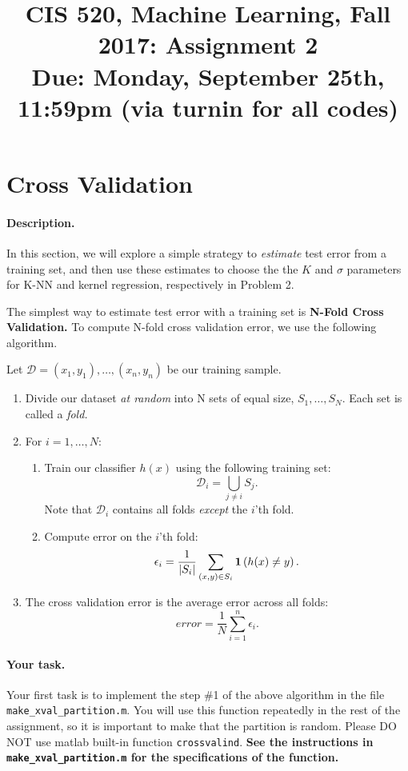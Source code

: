 \documentclass[english]{article}
\title{CIS 520, Machine Learning, Fall 2017: Assignment 2\\
Due: Monday, September 25th, 11:59pm (via turnin for all codes)
\ifthenelse{\boolean{ShowSolutions}}{ \\ \bf Solutions }{} }
\date{}
\begin{document}
\maketitle


\section{Cross Validation }

\paragraph{Description.} In this section, we will explore a simple
strategy to {\em estimate} test error from a training set, and then use these estimates to choose the the $K$ and $\sigma$ parameters for
K-NN and kernel regression, respectively in Problem 2.

The simplest way to estimate test error with a training set is {\bf
  N-Fold Cross Validation.} To compute N-fold cross validation error,
we use the following algorithm. 

Let $\mathcal{D} = (x_1, y_1), \dots,
(x_n, y_n)$ be our training sample.
\begin{enumerate}
\item Divide our dataset {\em at random} into N sets of equal size, $S_1, \dots,
  S_N$. Each set is called a {\em fold.}
\item For $i = 1, \dots, N:$ 
  \begin{enumerate}
  \item Train our classifier $h(x)$ using the following training set:
    $$\mathcal{D}_i = \bigcup_{j\ne i} S_j.$$
    Note that $\mathcal{D}_i$ contains all folds {\em except} the $i$'th fold.
  \item Compute error on the $i$'th fold:
    $$\epsilon_i = \frac{1}{|S_i|}\sum_{(x,y) \in S_i} \mathbf{1}\left(h(x) \ne y\right).$$
  \end{enumerate}
\item The cross validation error is the average error across all folds:
  $$error = \frac{1}{N} \sum_{i=1}^n \epsilon_i.$$
\end{enumerate}

\paragraph{Your task.} Your first task is to implement the step \#1 of the above algorithm in the file {\tt make\_xval\_partition.m}. 
You will use this function repeatedly in the rest of the assignment, so it is important to make that the partition is random. 
Please DO NOT use matlab built-in function {\tt crossvalind}. {\bf See the instructions in {\tt make\_xval\_partition.m} for the specifications of the function.}
\end{document}

